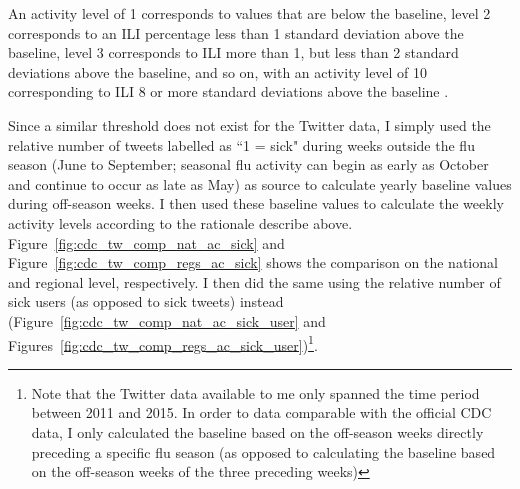 \documentclass[11pt, a4paper,twoside]{report}\usepackage[]{graphicx}\usepackage[]{color}
\begin{document}
An activity level of 1 corresponds to values that are below the baseline, level 2 corresponds to an ILI percentage less than 1 standard deviation above the baseline, level 3 corresponds to ILI more than 1, but less than 2 standard deviations above the baseline, and so on, with an activity level of 10 corresponding to ILI 8 or more standard deviations above the baseline \citep{cdc_surveillance_2016}.\newline
  
Since a similar threshold does not exist for the Twitter data, I simply used the relative number of tweets labelled as ``1 = sick" during weeks outside the flu season (June to September; seasonal flu activity can begin as early as October and continue to occur as late as May) as source to calculate yearly baseline values during off-season weeks. I then used these baseline values to calculate the weekly activity levels according to the rationale describe above. Figure~\ref{fig:cdc_tw_comp_nat_ac_sick} and Figure~\ref{fig:cdc_tw_comp_regs_ac_sick} shows the comparison on the national and regional level, respectively. I then did the same using the relative number of sick users (as opposed to sick tweets) instead (Figure~\ref{fig:cdc_tw_comp_nat_ac_sick_user} and Figures~\ref{fig:cdc_tw_comp_regs_ac_sick_user})\footnote{Note that the Twitter data available to me only spanned the time period between 2011 and 2015. In order to data comparable with the official CDC data, I only calculated the baseline based on the off-season weeks directly preceding a specific flu season (as opposed to calculating the baseline based on the off-season weeks of the three preceding weeks)}.\newline
\end{document}
